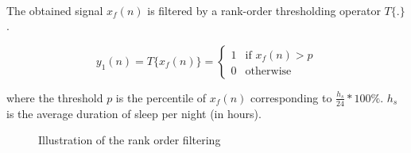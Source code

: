 \documentclass[a4paper,12pt]{article}
\begin{document}
\paragraph{}
\label{T-threshold}
The obtained signal $x_f(n)$ is filtered by a rank-order thresholding operator $T\{.\}$.

\begin{equation}
y_1(n) = T\{x_f(n)\} = \left\{
    \begin{array}{ll}
        1 & \mbox{if } x_f(n) > p \\
        0 & \mbox{otherwise}
    \end{array}
\right.
\end{equation}

where the threshold $p$ is the percentile of $x_f(n)$ corresponding to $\frac{h_s}{24}*100\%$. $h_s$ is the average duration of sleep per night (in hours).

\begin{figure}[H]
\centering
{}
\caption{Illustration of the rank order filtering}
\end{figure}
\end{document}
